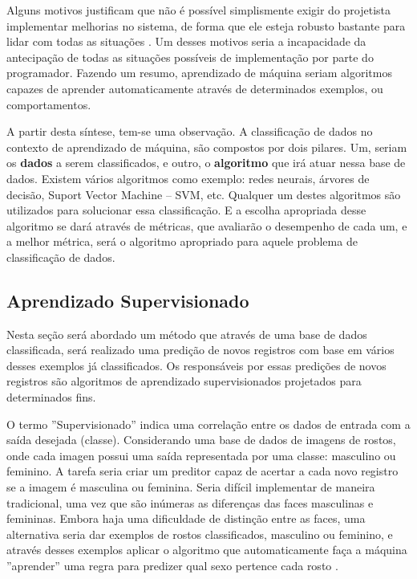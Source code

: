 Alguns motivos justificam que não é possível simplismente exigir do projetista implementar melhorias no sistema, de forma que ele esteja robusto bastante para lidar com todas as situações \cite{RusselStuart.Norvig2013}. Um  desses motivos seria a incapacidade da antecipação de todas as situações possíveis de implementação por parte do programador. Fazendo um resumo, aprendizado de máquina seriam algoritmos capazes de aprender automaticamente através de  determinados exemplos, ou comportamentos. 

A partir desta síntese, tem-se uma observação. A classificação de dados no contexto de aprendizado de máquina, são compostos por dois pilares. Um, seriam os \textbf{dados} a serem classificados, e outro, o \textbf{algoritmo} que irá atuar nessa base de dados. Existem vários algoritmos como exemplo: redes neurais, árvores de decisão, Suport Vector Machine – SVM, etc. Qualquer um destes algoritmos são utilizados para solucionar essa classificação. E a escolha apropriada desse algoritmo se dará através de métricas, que avaliarão o desempenho de cada um, e a melhor métrica, será o algoritmo apropriado para aquele problema de classificação de dados. 


\subsection{Aprendizado Supervisionado}\label{cap:refTeor:ssec:aprendSup}

Nesta seção será abordado um método que através de uma base de dados classificada, será realizado uma predição de novos registros com base em vários desses exemplos já classificados. Os responsáveis por essas predições de novos registros são algoritmos de aprendizado supervisionados projetados para determinados fins.


O termo ''Supervisionado'' indica uma correlação entre os dados de entrada com a saída desejada (classe). Considerando uma base de dados de imagens de rostos, onde cada imagen possui uma saída representada por uma classe: masculino ou feminino. A tarefa seria criar um preditor capaz de acertar a cada novo registro se a imagem é masculina ou feminina. Seria  difícil  implementar de maneira tradicional, uma vez que são inúmeras as diferenças das faces masculinas e femininas. Embora haja uma dificuldade de distinção entre as faces, uma alternativa seria dar exemplos de rostos classificados, masculino ou feminino,  e através desses exemplos aplicar o algoritmo que automaticamente faça a máquina ''aprender'' uma regra para predizer qual sexo pertence cada rosto  \cite{Barber2011}.

